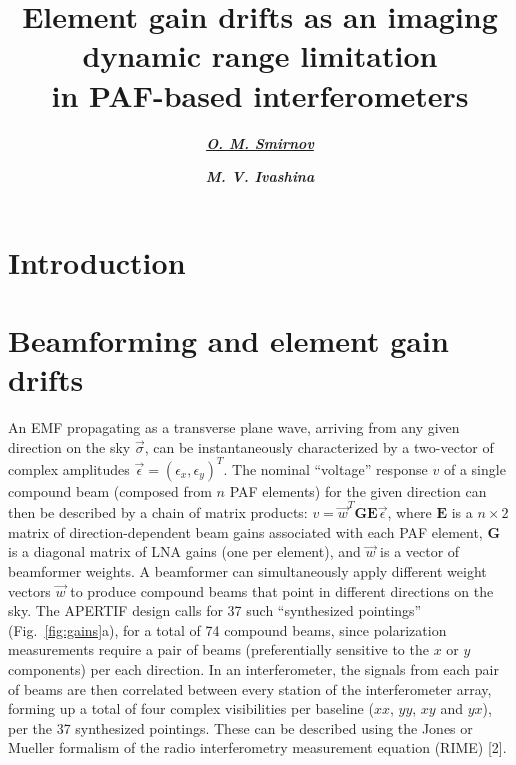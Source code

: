 \documentclass{aps2010} \special{papersize=8.5in,11in}
\title{Element gain drifts as an imaging dynamic range limitation\\in PAF-based
interferometers}
\author[org1]{\textbf{\underline{\emph{O. M. Smirnov}}}}
\author[org2]{\textbf{\emph{M. V. Ivashina}}}
\begin{document}
\maketitleblock


\section{Introduction}


\section{Beamforming and element gain drifts}

An EMF propagating as a transverse plane wave, arriving from any given direction on the sky $\vec\sigma$, can be 
instantaneously characterized by a two-vector of complex amplitudes $\vec \epsilon = (\epsilon_x,\epsilon_y)^T$. The nominal ``voltage'' response $v$ of a single compound beam (composed from $n$ PAF elements) for the given direction can then be described by a chain of matrix products: $v=\vec w^T \mathbf{G} \mathbf{E} \vec\epsilon$, where $\mathbf{E}$ is a $n\times2$ matrix of direction-dependent beam gains associated with each PAF element, $\mathbf{G}$ is a diagonal matrix of LNA gains (one per element), and $\vec w$ is a vector of beamformer weights. A beamformer can simultaneously apply different weight vectors $\vec w$ to produce compound beams that point in different directions on the sky. The APERTIF design calls for 37 such ``synthesized pointings''
(Fig.~\ref{fig:gains}a), for a total of 74 compound beams, since polarization measurements require a pair of beams (preferentially sensitive to the $x$ or $y$ components) per each direction. In an interferometer, the signals from each pair of beams are then correlated between every station of the interferometer array, forming up a total of four complex visibilities per baseline ($xx$, $yy$, $xy$ and $yx$), per the 37 synthesized pointings. These can be described using the Jones or Mueller formalism of the radio interferometry measurement equation (RIME) [2].
\end{document}
